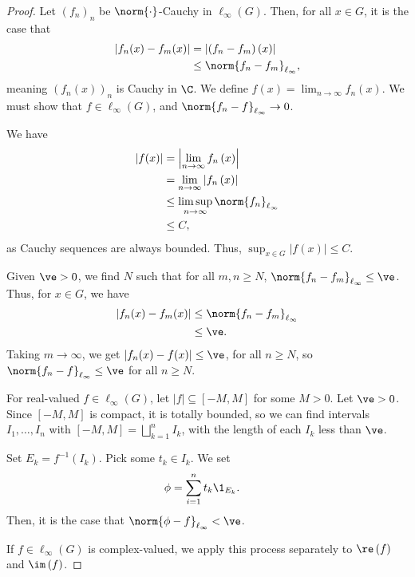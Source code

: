 \begin{proof}
  Let $\left(f_n\right)_n$ be $\norm{\cdot}$-Cauchy in $\ell_{\infty}\left(G\right)$. Then, for all $x\in G$, it is the case that
  \begin{align*}
    \left\vert f_n(x) - f_m(x) \right\vert &= \left\vert \left(f_n - f_m\right)\left(x\right) \right\vert\\
                                           &\leq \norm{f_n - f_m}_{\ell_{\infty}},
  \end{align*}
  meaning $\left(f_n\left(x\right)\right)_n$ is Cauchy in $\C$. We define $f(x) = \lim_{n\rightarrow\infty}f_n(x)$. We must show that $f\in \ell_{\infty}\left(G\right)$, and $\norm{f_n-f}_{\ell_{\infty}}\rightarrow 0$.\newline

  We have
  \begin{align*}
    \left\vert f(x) \right\vert &= \left\vert \lim_{n\rightarrow\infty}f_n\left(x\right) \right\vert\\
                                &= \lim_{n\rightarrow\infty}\left\vert f_n\left(x\right) \right\vert\\
                                &\leq \limsup_{n\rightarrow\infty}\norm{f_n}_{\ell_{\infty}}\\
                                &\leq C,
  \end{align*}
  as Cauchy sequences are always bounded. Thus, $\sup_{x\in G}\left\vert f(x) \right\vert\leq C$.\newline

  Given $\ve > 0$, we find $N$ such that for all $m,n\geq N$, $\norm{f_n - f_m}_{\ell_{\infty}} \leq \ve$. Thus, for $x\in G$, we have
  \begin{align*}
    \left\vert f_n(x) - f_m(x) \right\vert &\leq \norm{f_n - f_m}_{\ell_{\infty}}\\
                                           &\leq \ve.
  \end{align*}
  Taking $m\rightarrow\infty$, we get $\left\vert f_n(x) - f(x) \right\vert \leq \ve$, for all $n\geq N$, so $\norm{f_n - f}_{\ell_{\infty}}\leq \ve$ for all $n\geq N$.\newline

  For real-valued $f\in \ell_{\infty}\left(G\right)$, let $\left\vert f \right\vert \subseteq \left[-M,M\right]$ for some $M > 0$. Let $\ve > 0$. Since $\left[-M,M\right]$ is compact, it is totally bounded, so we can find intervals $I_{1},\dots,I_n$ with $\left[-M,M\right] = \bigsqcup_{k=1}^{n}I_k$, with the length of each $I_k$ less than $\ve$.\newline

  Set $E_k = f^{-1}\left(I_k\right)$. Pick some $t_k\in I_k$. We set
  \begin{align*}
    \phi &= \sum_{i=1}^{n}t_k\1_{E_k}.
  \end{align*}
  Then, it is the case that $\norm{\phi - f}_{\ell_{\infty}} < \ve$.\newline

  If $f\in \ell_{\infty}(G)$ is complex-valued, we apply this process separately to $\re\left(f\right)$ and $\im\left(f\right)$.
\end{proof}

